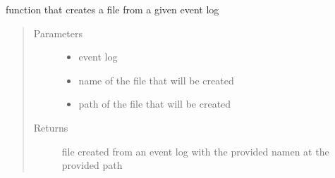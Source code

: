 \documentclass[letterpaper,10pt,english]{sphinxmanual}
\begin{document}
\begin{fulllineitems}
\begin{fulllineitems}
\label{\detokenize{eventLogConverter:eventLogConverter.fileHandlerBase.FileCreator.createFile}}
function that creates a file from a given event log
\begin{quote}\begin{description}
\item[{Parameters}] \leavevmode\begin{itemize}
\item {} 
 \textendash{} event log

\item {} 
 \textendash{} name of the file that will be created

\item {} 
 \textendash{} path of the file that will be created

\end{itemize}

\item[{Returns}] \leavevmode
file created from an event log with the provided namen at the provided path

\end{description}\end{quote}

\end{fulllineitems}


\end{fulllineitems}

\end{document}
